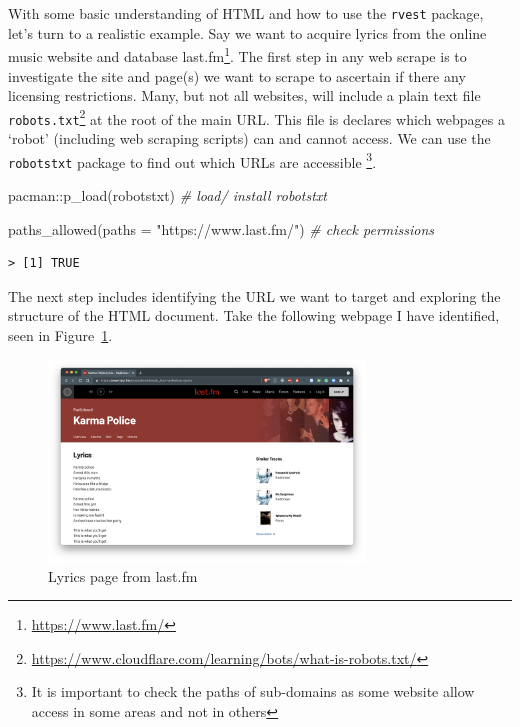 \documentclass[
  letterpaper,
]{latex/krantz}
\newenvironment{Shaded}{\begin{snugshade}}{\end{snugshade}}
\newcommand{\AttributeTok}[1]{\textcolor[rgb]{0.00,0.00,0.00}{#1}}
\newcommand{\CommentTok}[1]{\textcolor[rgb]{0.00,0.00,0.00}{\textit{#1}}}
\newcommand{\FunctionTok}[1]{\textcolor[rgb]{0.00,0.00,0.00}{#1}}
\newcommand{\NormalTok}[1]{\textcolor[rgb]{0.00,0.00,0.00}{#1}}
\newcommand{\SpecialCharTok}[1]{\textcolor[rgb]{0.00,0.00,0.00}{#1}}
\newcommand{\StringTok}[1]{\textcolor[rgb]{0.00,0.00,0.00}{#1}}
\DeclareRobustCommand{\href}[2]{#2\footnote{\url{#1}}}
\begin{document}
With some basic understanding of HTML and how to use the \texttt{rvest}
package, let's turn to a realistic example. Say we want to acquire
lyrics from the online music website and database
\href{https://www.last.fm/}{last.fm}. The first step in any web scrape
is to investigate the site and page(s) we want to scrape to ascertain if
there any licensing restrictions. Many, but not all websites, will
include a plain text file
\href{https://www.cloudflare.com/learning/bots/what-is-robots.txt/}{\texttt{robots.txt}}
at the root of the main URL. This file is declares which webpages a
`robot' (including web scraping scripts) can and cannot access. We can
use the \texttt{robotstxt} package to find out which URLs are accessible
\footnote{It is important to check the paths of sub-domains as some
  website allow access in some areas and not in others}.

\begin{Shaded}
\begin{Highlighting}[]
\NormalTok{pacman}\SpecialCharTok{::}\FunctionTok{p\_load}\NormalTok{(robotstxt) }\CommentTok{\# load/ install \textasciigrave{}robotstxt\textasciigrave{}}

\FunctionTok{paths\_allowed}\NormalTok{(}\AttributeTok{paths =} \StringTok{"https://www.last.fm/"}\NormalTok{) }\CommentTok{\# check permissions}
\end{Highlighting}
\end{Shaded}

\begin{verbatim}
> [1] TRUE
\end{verbatim}

The next step includes identifying the URL we want to target and
exploring the structure of the HTML document. Take the following webpage
I have identified, seen in
Figure~\ref{fig-ad-example-lyrics-page-lastfm}.

\begin{figure}[h]

{\centering \includegraphics[width=0.75\textwidth,height=\textheight]{figures/acquire-data/ad-lastfm-webpage-lyrics.png}

}

\caption{\label{fig-ad-example-lyrics-page-lastfm}Lyrics page from
last.fm}

\end{figure}
\end{document}
